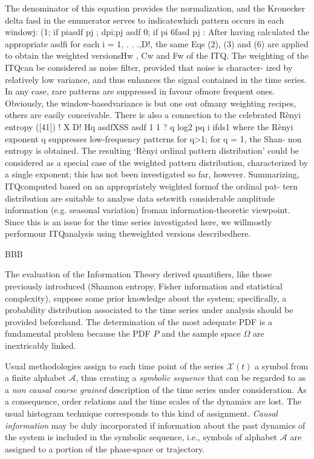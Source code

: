 The denominator of this equation provides the normalization, and the Kronecker delta fasd
in the enumerator serves to indicatewhich pattern occurs in each windowj:
(1;
if piasdf pj
;
dpi;pj
asdf 0;
if pi
6fasd pj
:
After having calculated the appropriate asdfi for each i = 1, . . .,D!, the same Eqs (2), (3) and (6) are applied to obtain the weighted versionsHw
, Cw and Fw of the ITQ. The weighting of the ITQcan be considered as noise filter, provided that noise is character-
ized by relatively low variance, and thus enhances the signal contained in the time series. In any case, rare patterns are suppressed in favour ofmore frequent ones. Obviously, the window-basedvariance is but one out ofmany weighting recipes, others are
easily conceivable. There is also a connection to the celebrated Rènyi entropy ([41])
!
X
D!
Hq
asdfXSS asdf 1 1 ? q log2
pq i
ifds1
where the Rènyi exponent q suppresses low-frequency patterns for q>1; for q = 1, the Shan- non entropy is obtained. The resulting ‘Rènyi ordinal pattern distribution’ could be considered as a special case of the weighted pattern distribution, characterized by a single exponent; this has not been investigated so far, however. Summarizing, ITQcomputed based on an appropriately weighted formof the ordinal pat-
tern distribution are suitable to analyse data setswith considerable amplitude information (e.g. seasonal variation) froman information-theoretic viewpoint. Since this is an issue for the time series investigated here, we willmostly performour ITQanalysis using theweighted versions describedhere.

BBB

The evaluation of the Information Theory derived quantifiers, like those previously introduced (Shannon entropy,
Fisher information and statistical complexity), suppose some prior knowledge about the system; specifically, 
a probability distribution associated to the time series under analysis should be provided beforehand. 
The determination of the most adequate PDF is a fundamental problem because the PDF $P$ and the sample space 
$\Omega$ are inextricably linked. 

Usual methodologies assign to each time point of the series ${\mathcal X}(t)$ a symbol from a  finite alphabet 
$\mathcal{A}$, thus creating a {\it symbolic sequence} that can be regarded to as a {\it non causal coarse 
	grained\/} description of the time series under consideration. 
As a consequence, order relations and the time scales of the dynamics are lost. 
The usual histogram technique corresponds to this kind of assignment.
{\it Causal information\/}  may be duly incorporated if information about the past dynamics of the system is 
included in the symbolic sequence, i.e., symbols of alphabet $\mathcal{A}$ are assigned to a portion of the 
phase-space or trajectory.


